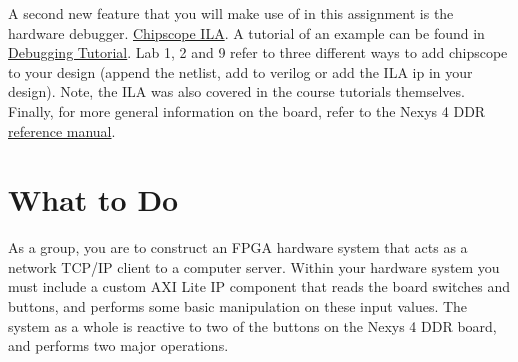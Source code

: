 \documentclass[11pt]{article}
\begin{document}
A second new feature that you will make use of in this assignment is the hardware debugger.
\href{https://www.xilinx.com/support/documentation/ip_documentation/ila/v6_2/pg172-ila.pdf}{\color{blue}Chipscope ILA}. A tutorial of an example can be found in \href{https://www.xilinx.com/support/documentation/sw_manuals/xilinx2017_2/ug936-vivado-tutorial-programming-debugging.pdf}{\color{blue}Debugging Tutorial}. Lab 1, 2 and 9 refer to three different ways to add chipscope to your design (append the netlist, add to verilog or add the ILA ip in your design). Note, the ILA was also covered in the course tutorials themselves. Finally, for more general information on the board, refer to the Nexys 4 DDR \href{https://reference.digilentinc.com/reference/programmable-logic/nexys-4-ddr/reference-manual}{\color{blue}reference manual}.





\section{What to Do}
\label{sec:instr}
As a group, you are to construct an FPGA hardware system that acts as a network TCP/IP client to a computer server.
Within your hardware system you must include a custom AXI Lite IP component that reads the board switches and buttons, and performs some basic manipulation on these input values. 
The system as a whole is reactive to two of the buttons on the Nexys 4 DDR board, and performs two major operations.
\\
\\
\end{document}
